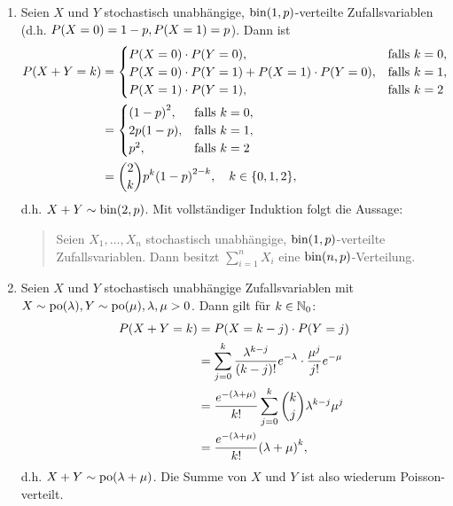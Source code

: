 \documentclass{lecture}
\begin{document}
    \begin{example}
        \begin{enumerate}
            \item Seien \(X\) und \(Y\) stochastisch unabhängige, \(\bin\parentheses*{1, p}\)-verteilte Zufallsvariablen (d.h. \(P\parentheses*{X = 0} = 1 - p, P\parentheses*{X = 1} = p\)).
            Dann ist
            \begin{align*}
                P\parentheses*{X + Y = k} &= \begin{cases}
                    P\parentheses*{X = 0} \cdot P\parentheses*{Y = 0}, & \text{falls }k = 0,\\
                    P\parentheses*{X = 0} \cdot P\parentheses*{Y = 1} + P\parentheses*{X = 1} \cdot P\parentheses*{Y = 0}, & \text{falls }k = 1,\\
                    P\parentheses*{X = 1} \cdot P\parentheses*{Y = 1}, & \text{falls }k = 2
                \end{cases}\\
                &= \begin{cases}
                    \parentheses*{1 - p}^2, & \text{falls }k = 0,\\
                    2p\parentheses*{1 - p}, & \text{falls }k = 1,\\
                    p^2, & \text{falls }k = 2
                \end{cases}\\
                &= \binom{2}{k}p^k \parentheses*{1 - p}^{2 - k}, \quad k \in \braces*{0, 1, 2},
            \end{align*}
            d.h. \(X + Y \sim \bin\parentheses*{2, p}\).
            Mit vollständiger Induktion folgt die Aussage:
            \begin{quote}
                Seien \(X_1, \ldots, X_n\) stochastisch unabhängige, \(\bin\parentheses*{1, p}\)-verteilte Zufallsvariablen.
                Dann besitzt \(\sum_{i = 1}^n X_i\) eine \(\bin\parentheses*{n, p}\)-Verteilung.
            \end{quote}
            \item Seien \(X\) und \(Y\) stochastisch unabhängige Zufallsvariablen mit \(X \sim \po\parentheses*{\lambda}, Y \sim \po\parentheses*{\mu}, \lambda, \mu > 0\).
            Dann gilt für \(k \in \mathbb{N}_0\):
            \begin{align*}
                P\parentheses*{X + Y = k} &= P\parentheses*{X = k - j} \cdot P\parentheses*{Y = j}\\
                &= \sum_{j = 0}^k \frac{\lambda^{k - j}}{\parentheses*{k - j}!}e^{-\lambda} \cdot \frac{\mu^j}{j!}e^{-\mu}\\
                &= \frac{e^{-\parentheses*{\lambda + \mu}}}{k!}\sum_{j = 0}^k \binom{k}{j}\lambda^{k - j}\mu^j\\
                &= \frac{e^{-\parentheses*{\lambda + \mu}}}{k!}\parentheses*{\lambda + \mu}^k,
            \end{align*}
            d.h. \(X + Y \sim \po \parentheses*{\lambda + \mu}\).
            Die Summe von \(X\) und \(Y\) ist also wiederum Poisson-verteilt.
        \end{enumerate}
    \end{example}
\end{document}
